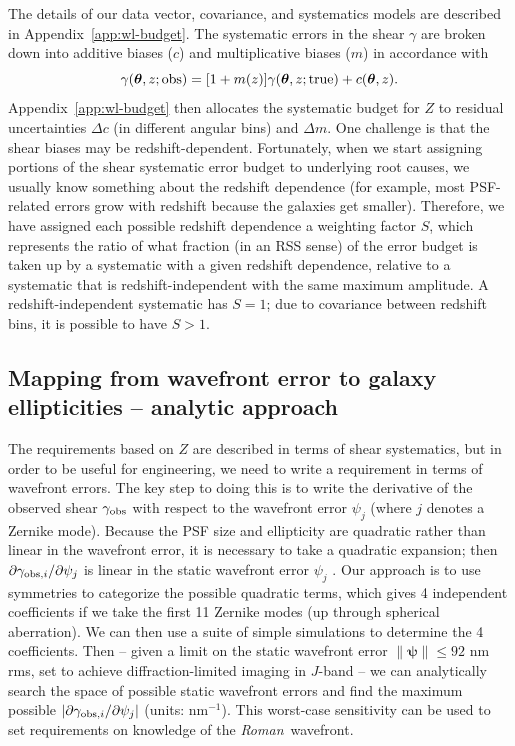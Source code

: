\documentclass[usenatbib]{mnras}
\newcommand{\wfirst}{{\slshape Roman}}
\begin{document}
The details of our data vector, covariance, and systematics models are described in Appendix~\ref{app:wl-budget}. The systematic errors in the shear $\gamma$ are broken down into additive biases ($c$) and multiplicative biases ($m$) in accordance with
\begin{equation}
\gamma({\boldsymbol\theta},z;{\rm obs}) = [1+m(z)] \gamma({\boldsymbol\theta},z;{\rm true}) + c({\boldsymbol\theta},z).
\label{eq:gmod}
\end{equation}
Appendix~\ref{app:wl-budget} then allocates the systematic budget for $Z$ to residual uncertainties $\Delta c$ (in different angular bins) and $\Delta m$. One challenge is that the shear biases may be redshift-dependent. Fortunately, when we start assigning portions of the shear systematic error budget to underlying root causes, we usually know something about the redshift dependence (for example, most PSF-related errors grow with redshift because the galaxies get smaller). Therefore, we have assigned each possible redshift dependence a weighting factor $S$, which represents the ratio of what fraction (in an RSS sense) of the error budget is taken up by a systematic with a given redshift dependence, relative to a systematic that is redshift-independent with the same maximum amplitude. A redshift-independent systematic has $S=1$; due to covariance between redshift bins, it is possible to have $S>1$.

\subsection{Mapping from wavefront error to galaxy ellipticities -- analytic approach}
\label{ss:dedZ}

The requirements based on $Z$ are described in terms of shear systematics, but in order to be useful for engineering, we need to write a requirement in terms of wavefront errors. The key step to doing this is to write the derivative of the observed shear $\gamma_{\rm obs}$ with respect to the wavefront error $\psi_j$ (where $j$ denotes a Zernike mode). Because the PSF size and ellipticity are quadratic rather than linear in the wavefront error, it is necessary to take a quadratic expansion; then $\partial\gamma_{{\rm obs},i}/\partial\psi_j$ is linear in the static wavefront error $\psi_j$ \citep{2010SPIE.7731E..1EN}. Our approach is to use symmetries to categorize the possible quadratic terms, which gives 4 independent coefficients if we take the first 11 Zernike modes (up through spherical aberration). We can then use a suite of simple simulations to determine the 4 coefficients. Then -- given a limit on the static wavefront error $\lVert{\boldsymbol\psi}\rVert \le 92$ nm rms, set to achieve diffraction-limited imaging in $J$-band -- we can analytically search the space of possible static wavefront errors and find the maximum possible $|\partial\gamma_{{\rm obs},i}/\partial\psi_j|$ (units: nm$^{-1}$). This worst-case sensitivity can be used to set requirements on knowledge of the \wfirst\ wavefront.
\end{document}
